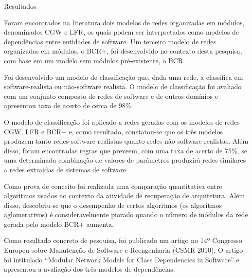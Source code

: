 \begin{section}{Resultados}
	
	Foram encontrados na literatura dois modelos de redes organizadas em módulos, denominados CGW e LFR, os quais podem ser interpretados como modelos de dependências entre entidades de software. Um terceiro modelo de redes organizadas em módulos, o BCR+, foi desenvolvido no contexto desta pesquisa, com base em um modelo sem módulos pré-existente, o BCR. 
	
	Foi desenvolvido um modelo de classificação que, dada uma rede, a classifica em software-realista ou não-software realista. O modelo de classificação foi avaliado com um conjunto composto de redes de software e de outros domínios e apresentou taxa de acerto de cerca de 98\%.
	
	O modelo de classificação foi aplicado a redes geradas com os modelos de redes CGW, LFR e BCR+ e, como resultado, constatou-se que os três modelos produzem tanto redes software-realistas quanto redes não software-realistas. Além disso, foram encontradas regras que preveem, com uma taxa de acerto de 75\%, se uma determinada combinação de valores de parâmetros produzirá redes similares a redes extraídas de sistemas de software.
	
	Como prova de conceito foi realizada uma comparação quantitativa entre algoritmos usados no contexto da atividade de recuperação de arquitetura. Além disso, descobriu-se que o desempenho de certos algoritmos (os algoritmos aglomerativos) é consideravelmente piorado quando o número de módulos da rede gerada pelo modelo BCR+ aumenta.
	
	Como resultado concreto de pesquisa, foi publicado um artigo no 14º Congresso Europeu sobre Manutenção de Software e Reengenharia (CSMR 2010). O artigo foi intitulado ``Modular Network Models for Class Dependencies in Software'' e apresentou a avaliação dos três modelos de dependências.

	
\end{section}

